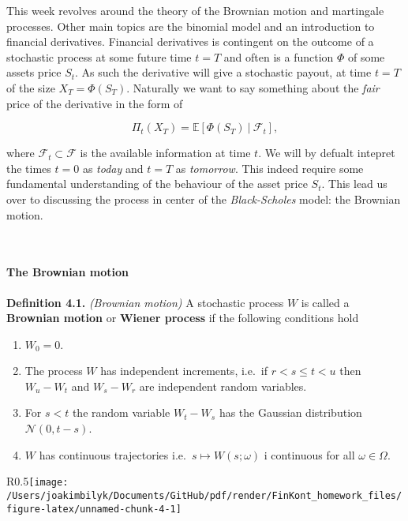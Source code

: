 \documentclass[
]{article}
\providecommand{\tightlist}{%
  \setlength{\itemsep}{0pt}\setlength{\parskip}{0pt}}
\begin{document}
This week revolves around the theory of the Brownian motion and
martingale processes. Other main topics are the binomial model and an
introduction to financial derivatives. Financial derivatives is
contingent on the outcome of a stochastic process at some future time
\(t=T\) and often is a function \(\Phi\) of some assets price \(S_t\).
As such the derivative will give a stochastic payout, at time \(t=T\) of
the size \(X_T=\Phi(S_T)\). Naturally we want to say something about the
\emph{fair} price of the derivative in the form of

\[\Pi_t(X_T)=\mathbb{E}\left[\Phi(S_T)\ \vert\ \mathcal{F}_t\right],\]

where \(\mathcal{F}_t\subset\mathcal{F}\) is the available information
at time \(t\). We will by defualt intepret the times \(t=0\) as
\emph{today} and \(t=T\) as \emph{tomorrow}. This indeed require some
fundamental understanding of the behaviour of the asset price \(S_t\).
This lead us over to discussing the process in center of the
\emph{Black-Scholes} model: the Brownian motion.

~

\hypertarget{the-brownian-motion}{%
\paragraph{The Brownian motion}\label{the-brownian-motion}}

\textbf{Definition 4.1.} \emph{(Brownian motion)} A stochastic process
\(W\) is called a \textbf{Brownian motion} or \textbf{Wiener process} if
the following conditions hold

\begin{enumerate}
\def\labelenumi{\arabic{enumi}.}
\tightlist
\item
  \(W_0=0\).
\item
  The process \(W\) has independent increments, i.e.~if \(r<s\le t< u\)
  then \(W_u-W_t\) and \(W_s-W_r\) are independent random variables.
\item
  For \(s<t\) the random variable \(W_t-W_s\) has the Gaussian
  distribution \(\mathcal{N}(0,t-s)\).
\item
  \(W\) has continuous trajectories i.e.~\(s\mapsto W(s;\omega)\) i
  continuous for all \(\omega \in\Omega\).
\end{enumerate}

\begin{wrapfigure}{R}{0.5\textwidth}\texttt{[image: /Users/joakimbilyk/Documents/GitHub/pdf/render/FinKont\_homework\_files/figure-latex/unnamed-chunk-4-1]}\end{wrapfigure}
\end{document}
